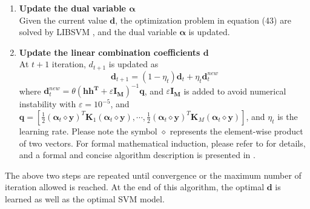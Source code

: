 \begin{enumerate}
	\item{\bf Update the dual variable $\boldsymbol{\alpha}$} \\
	Given the current value $\mathbf{d}$, the optimization problem in equation (43) are  solved by LIBSVM \cite{CC01a}, and the dual variable $\boldsymbol{\alpha}$ is updated.

	\item{\bf Update the linear combination coefficients $\mathbf{d}$}\\
	At $ t+1 $ iteration, $d_{t+1}$ is updated as
	\begin{equation}
	\mathbf{d}_{t+1} = (1 - \eta_t) \mathbf{d}_{t} + \eta_t \mathbf{d}_t^{new}
	\end{equation}
	where $\mathbf{d}_t^{new} = \theta(\mathbf{h h^T} + \varepsilon \mathbf{I_M})^{-1} \mathbf{q}$, and $\varepsilon \mathbf{I_M}$ is added to avoid numerical instability with $\varepsilon = 10^{-5}$, and $\mathbf{q} = [\frac{1}{2}(\boldsymbol{\alpha}_t \diamond \mathbf{y})^T \mathbf{K}_1 (\boldsymbol{\alpha}_t \diamond \mathbf{y}), \cdots, \frac{1}{2}(\boldsymbol{\alpha}_t \diamond \mathbf{y})^T \mathbf{K}_M (\boldsymbol{\alpha}_t \diamond \mathbf{y})]$, and $\eta_t$ is the learning rate. Please note the symbol $\diamond$ represents the element-wise product of two vectors. For formal mathematical induction, please refer to \cite{duan2009domain,duan2012visual} for details, and a formal and concise algorithm description is presented in \cite{duan2012visual}. 
\end{enumerate}

\noindent The above two steps are repeated until convergence or the maximum number of iteration allowed is reached. At the end of this algorithm, the optimal $\mathbf{d}$ is learned as well as the optimal SVM model.

\noindent 

